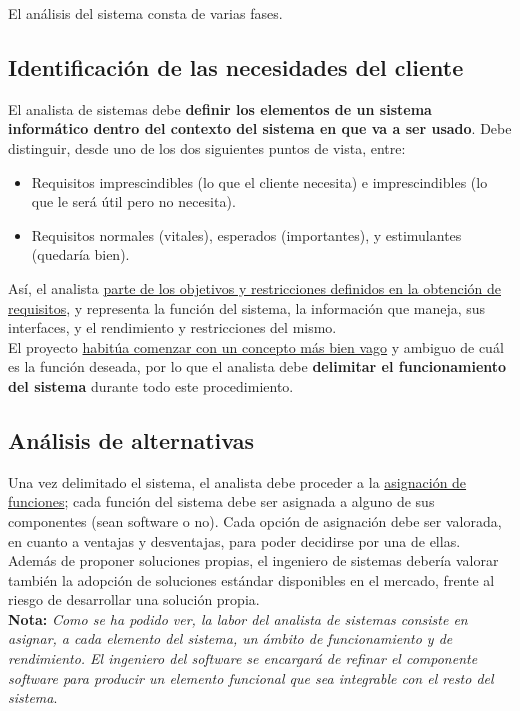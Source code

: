 El análisis del sistema consta de varias fases.

\subsection{Identificación de las necesidades del cliente}

El analista de sistemas debe \textbf{definir los elementos de un sistema informático dentro del contexto del sistema en que va a ser usado}. Debe distinguir, desde uno de los dos siguientes puntos de vista, entre:

\begin{itemize}
    \item Requisitos imprescindibles (lo que el cliente necesita) e imprescindibles (lo que le será útil pero no necesita).
    \item Requisitos normales (vitales), esperados (importantes), y estimulantes (quedaría bien).
\end{itemize}

Así, el analista \uline{parte de los objetivos y restricciones definidos en la obtención de requisitos}, y representa la función del sistema, la información que maneja, sus interfaces, y el rendimiento y restricciones del mismo.\\

El proyecto \uline{habitúa comenzar con un concepto más bien vago} y ambiguo de cuál es la función deseada, por lo que el analista debe \textbf{delimitar el funcionamiento del sistema} durante todo este procedimiento.

\subsection{Análisis de alternativas}

Una vez delimitado el sistema, el analista debe proceder a la \uline{asignación de funciones}; cada función del sistema debe ser asignada a alguno de sus componentes (sean software o no). Cada opción de asignación debe ser valorada, en cuanto a ventajas y desventajas, para poder decidirse por una de ellas.\\

Además de proponer soluciones propias, el ingeniero de sistemas debería valorar también la adopción de soluciones estándar disponibles en el mercado, frente al riesgo de desarrollar una solución propia.\\

\textbf{Nota:} \textit{Como se ha podido ver, la labor del analista de sistemas consiste en asignar, a cada elemento del sistema, un ámbito de funcionamiento y de rendimiento. El ingeniero del software se encargará de refinar el componente software para producir un elemento funcional que sea integrable con el resto del sistema}.\\

